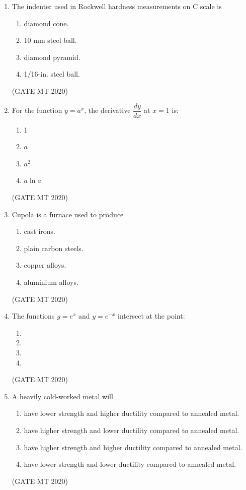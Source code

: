 \documentclass[journal, 11pt, onecolumn]{IEEEtran}
\theoremstyle{remark}
\begin{document}
\begin{enumerate}
\item The indenter used in Rockwell hardness measurements on C scale is
\begin{enumerate}
\item diamond cone.  
\item 10 mm steel ball.  
\item diamond pyramid.  
\item 1/16-in. steel ball.  
\end{enumerate}
\hfill(GATE MT 2020)


\item For the function $y = a^x$, the derivative $\dfrac{dy}{dx}$ at $x=1$ is:
\begin{enumerate}
\item 1  
\item $a$  
\item $a^2$  
\item $a \ln a$  
\end{enumerate}
\hfill(GATE MT 2020)


\item Cupola is a furnace used to produce
\begin{enumerate}
\item cast irons.  
\item plain carbon steels.  
\item copper alloys.  
\item aluminium alloys.  
\end{enumerate}
\hfill(GATE MT 2020)


\item The functions $y = e^x$ and $y = e^{-x}$ intersect at the point:
\begin{multicols}{4}
\begin{enumerate}
\item {} 
\item {}  
\item {}
\item {}  
\end{enumerate}
\end{multicols}
\hfill(GATE MT 2020)


\item A heavily cold-worked metal will
\begin{enumerate}
\item have lower strength and higher ductility compared to annealed metal.  
\item have higher strength and lower ductility compared to annealed metal.  
\item have higher strength and higher ductility compared to annealed metal.  
\item have lower strength and lower ductility compared to annealed metal.  
\end{enumerate}
\hfill(GATE MT 2020)



\end{enumerate}
\end{document}
